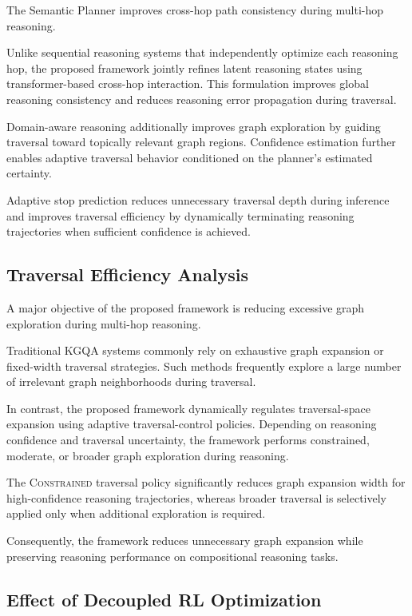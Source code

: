 \documentclass[10pt,conference]{IEEEtran}
\begin{document}
The Semantic Planner improves cross-hop path consistency during multi-hop reasoning.

Unlike sequential reasoning systems that independently optimize each reasoning hop, the proposed framework jointly refines latent reasoning states using transformer-based cross-hop interaction. This formulation improves global reasoning consistency and reduces reasoning error propagation during traversal.

Domain-aware reasoning additionally improves graph exploration by guiding traversal toward topically relevant graph regions. Confidence estimation further enables adaptive traversal behavior conditioned on the planner's estimated certainty.

Adaptive stop prediction reduces unnecessary traversal depth during inference and improves traversal efficiency by dynamically terminating reasoning trajectories when sufficient confidence is achieved.

\subsection{Traversal Efficiency Analysis}

A major objective of the proposed framework is reducing excessive graph exploration during multi-hop reasoning.

Traditional KGQA systems commonly rely on exhaustive graph expansion or fixed-width traversal strategies. Such methods frequently explore a large number of irrelevant graph neighborhoods during traversal.

In contrast, the proposed framework dynamically regulates traversal-space expansion using adaptive traversal-control policies. Depending on reasoning confidence and traversal uncertainty, the framework performs constrained, moderate, or broader graph exploration during reasoning.

The \textsc{Constrained} traversal policy significantly reduces graph expansion width for high-confidence reasoning trajectories, whereas broader traversal is selectively applied only when additional exploration is required.

Consequently, the framework reduces unnecessary graph expansion while preserving reasoning performance on compositional reasoning tasks.

\subsection{Effect of Decoupled RL Optimization}
\end{document}
